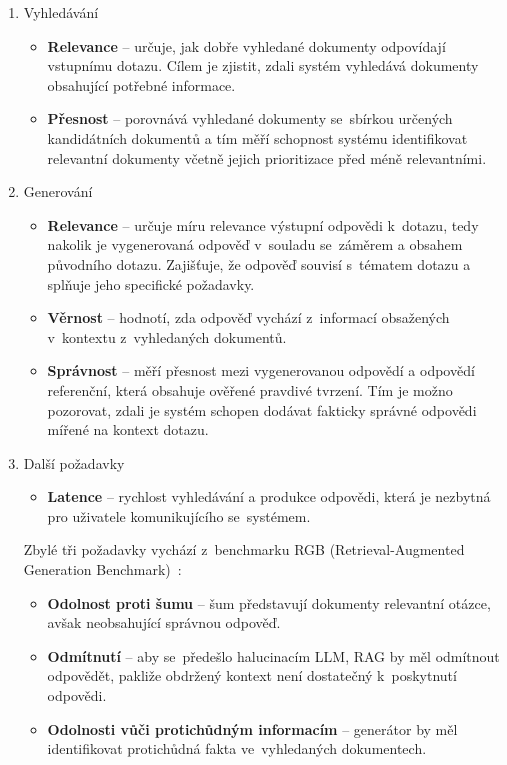 \begin{enumerate}
    \item Vyhledávání
    \begin{itemize}
        \item \textbf{Relevance} – určuje, jak dobře vyhledané dokumenty odpovídají vstupnímu dotazu. Cílem je zjistit, zdali systém vyhledává dokumenty obsahující potřebné informace. 
        \item \textbf{Přesnost} – porovnává vyhledané dokumenty se~sbírkou určených kandidátních dokumentů a tím měří schopnost systému identifikovat relevantní dokumenty včetně jejich prioritizace před méně relevantními.
    \end{itemize}
    \item Generování
    \begin{itemize}
        \item \textbf{Relevance} – určuje míru relevance výstupní odpovědi k~dotazu, tedy nakolik je vygenerovaná odpověď v~souladu se~záměrem a obsahem původního dotazu. Zajišťuje, že odpověď souvisí s~tématem dotazu a splňuje jeho specifické požadavky.
        \item \textbf{Věrnost} – hodnotí, zda odpověď vychází z~informací obsažených v~kontextu z~vyhledaných dokumentů.
        \item \textbf{Správnost} – měří přesnost mezi vygenerovanou odpovědí a odpovědí referenční, která obsahuje ověřené pravdivé tvrzení. Tím je možno pozorovat, zdali je systém schopen dodávat fakticky správné odpovědi mířené na kontext dotazu.
    \end{itemize}
    \item Další požadavky
    \begin{itemize}
        \item \textbf{Latence} – rychlost vyhledávání a produkce odpovědi, která je nezbytná pro uživatele komunikujícího se~systémem.
    \end{itemize}
    Zbylé tři požadavky vychází z~benchmarku RGB (Retrieval-Augmented Generation Benchmark)~\cite{chen2023benchmarkinglargelanguagemodels}:
    \begin{itemize}
        \item \textbf{Odolnost proti šumu} – šum představují dokumenty relevantní otázce, avšak neobsahující správnou odpověď.
        \item \textbf{Odmítnutí} – aby se~předešlo halucinacím LLM, RAG by měl odmítnout odpovědět, pakliže obdržený kontext není dostatečný k~poskytnutí odpovědi.
        \item \textbf{Odolnosti vůči protichůdným informacím} – generátor by měl identifikovat protichůdná fakta ve~vyhledaných dokumentech.
    \end{itemize}
\end{enumerate}

